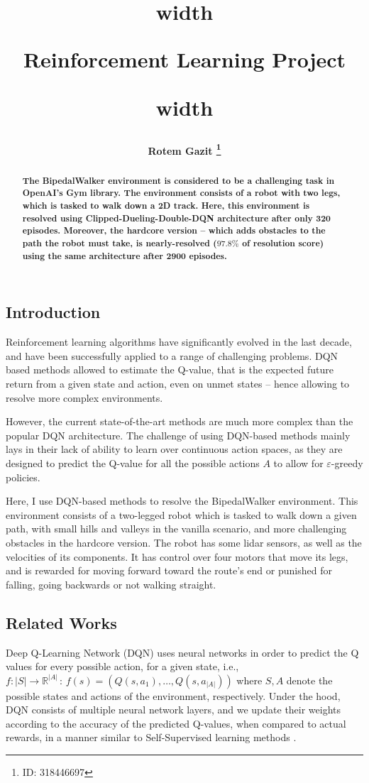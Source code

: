 \documentclass{article}
\title{
\noindent\vrule height 2.5pt width \textwidth
\begin{center}
    \bfseries Reinforcement Learning Project
\end{center}
\noindent\vrule height 2.5pt width \textwidth
}
\author{\bfseries Rotem Gazit \thanks{ID: 318446697}}
\date{}
\begin{document}
\maketitle


\begin{abstract}
\bfseries
The BipedalWalker environment is considered to be a challenging task in OpenAI's Gym library. The environment consists of a robot with two legs, which is tasked to walk down a 2D track. Here, this environment is resolved using Clipped-Dueling-Double-DQN architecture after only 320 episodes. Moreover, the hardcore version -- which adds obstacles to the path the robot must take, is nearly-resolved ($97.8\%$ of resolution score) using the same architecture after 2900 episodes.
\end{abstract}

\begin{multicols}{2}
\section{Introduction}
Reinforcement learning algorithms have significantly evolved in the last decade, and have been successfully applied to a range of challenging problems. DQN based methods allowed to estimate the Q-value, that is the expected future return from a given state and action, even on unmet states -- hence allowing to resolve more complex environments. 

However, the current state-of-the-art methods are much more complex than the popular DQN architecture. The challenge of using DQN-based methods mainly lays in their lack of ability to learn over continuous action spaces, as they are designed to predict the Q-value for all the possible actions $A$ to allow for $\varepsilon$-greedy policies. 

Here, I use DQN-based methods to resolve the BipedalWalker environment. This environment consists of a two-legged robot which is tasked to walk down a given path, with small hills and valleys in the vanilla scenario, and more challenging obstacles in the hardcore version. The robot has some lidar sensors, as well as the velocities of its components. It has control over four motors that move its legs, and is rewarded for moving forward toward the route's end or punished for falling, going backwards or not walking straight.


\subsection{Related Works}
Deep Q-Learning Network (DQN) uses neural networks in order to predict the Q values for every possible action, for a given state, i.e., $f: |S| \to \mathbb{R}^{|A|} \, : \, f(s) = (Q(s,a_1), \dots, Q(s,a_{|A|}))$ where $S, A$ denote the possible states and actions of the environment, respectively. 
Under the hood, DQN consists of multiple neural network layers, and we update their weights according to the accuracy of the predicted Q-values, when compared to actual rewards, in a manner similar to Self-Supervised learning methods \cite{DQN}. 


\end{multicols}
\end{document}
